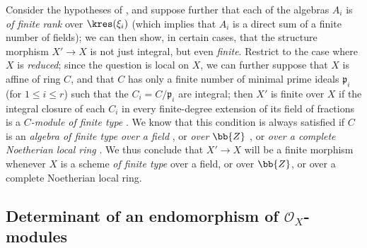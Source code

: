 \begin{remark}[6.3.10]
\label{II.6.3.10}
Consider the hypotheses of , and suppose further that each of the algebras $A_i$ is \emph{of finite rank} over $\kres(\xi_i)$ (which implies that $A_i$ is a direct sum of a finite number of fields);
we can then show, in certain cases, that the structure morphism $X'\to X$ is not just integral, but even \emph{finite}.
Restrict to the case where $X$ is \emph{reduced};
since the question is local on $X$, we can further suppose that $X$ is affine of ring $C$, and that $C$ has only a finite number of minimal prime ideals $\mathfrak{p}_i$ (for $1\leq i\leq r$) such that the $C_i=C/\mathfrak{p}_i$ are integral;
then $X'$ is finite over $X$ if the integral closure of each $C_i$ in every finite-degree extension of its field of fractions is a \emph{$C$-module of finite type} .
We know that this condition is always satisfied if $C$ is an \emph{algebra of finite type over a field} \cite[t.~I, p.~267, th.~9]{I-13}, or \emph{over $\bb{Z}$} \cite[I,p.~93, th.~3]{I-9}, or \emph{over a complete Noetherian local ring} \cite[p.~298]{II-25}.
We thus conclude that $X'\to X$ will be a finite morphism whenever $X$ is a scheme \emph{of finite type} over a field, or over $\bb{Z}$, or over a complete Noetherian local ring.
\end{remark}


\subsection{Determinant of an endomorphism of $\mathcal{O}_X$-modules}
\label{subsection:II.6.4}

